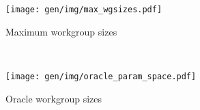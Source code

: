 \begin{subfigure}[t]{0.45\textwidth}
\centering
\texttt{[image: gen/img/max\_wgsizes.pdf]}
\vspace{-1.5em} %
\caption{Maximum workgroup sizes}
\label{fig:max-wgsizes}
\end{subfigure}
~%
\begin{subfigure}[t]{0.45\textwidth}
\centering
\texttt{[image: gen/img/oracle\_param\_space.pdf]}
\vspace{-1.5em} %
\caption{Oracle workgroup sizes}
\label{fig:oracle-wgsizes}
\end{subfigure}
